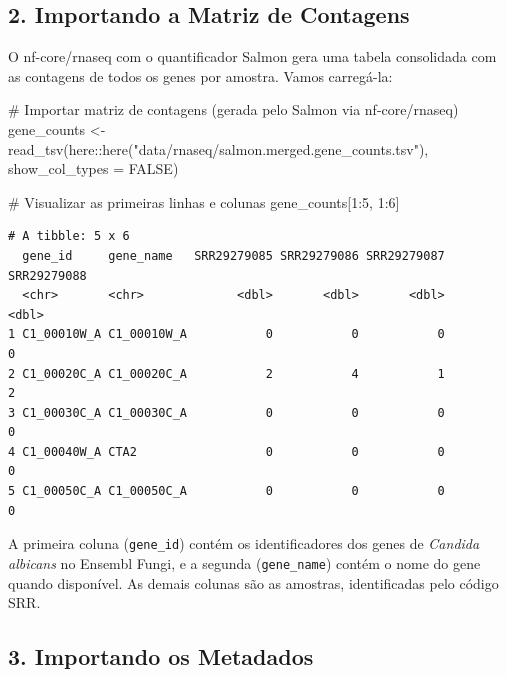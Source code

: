 \documentclass[
  letterpaper,
  DIV=11,
  numbers=noendperiod]{scrreprt}
\newenvironment{Shaded}{\begin{snugshade}}{\end{snugshade}}
\newcommand{\AttributeTok}[1]{\textcolor[rgb]{0.40,0.45,0.13}{#1}}
\newcommand{\CommentTok}[1]{\textcolor[rgb]{0.37,0.37,0.37}{#1}}
\newcommand{\ConstantTok}[1]{\textcolor[rgb]{0.56,0.35,0.01}{#1}}
\newcommand{\DecValTok}[1]{\textcolor[rgb]{0.68,0.00,0.00}{#1}}
\newcommand{\FunctionTok}[1]{\textcolor[rgb]{0.28,0.35,0.67}{#1}}
\newcommand{\NormalTok}[1]{\textcolor[rgb]{0.00,0.23,0.31}{#1}}
\newcommand{\OtherTok}[1]{\textcolor[rgb]{0.00,0.23,0.31}{#1}}
\newcommand{\SpecialCharTok}[1]{\textcolor[rgb]{0.37,0.37,0.37}{#1}}
\newcommand{\StringTok}[1]{\textcolor[rgb]{0.13,0.47,0.30}{#1}}
\begin{document}
\subsection{2. Importando a Matriz de
Contagens}\label{importando-a-matriz-de-contagens}

O nf-core/rnaseq com o quantificador Salmon gera uma tabela consolidada
com as contagens de todos os genes por amostra. Vamos carregá-la:

\begin{Shaded}
\begin{Highlighting}[]
\CommentTok{\# Importar matriz de contagens (gerada pelo Salmon via nf{-}core/rnaseq)}
\NormalTok{gene\_counts }\OtherTok{\textless{}{-}} \FunctionTok{read\_tsv}\NormalTok{(here}\SpecialCharTok{::}\FunctionTok{here}\NormalTok{(}\StringTok{"data/rnaseq/salmon.merged.gene\_counts.tsv"}\NormalTok{),}
                        \AttributeTok{show\_col\_types =} \ConstantTok{FALSE}\NormalTok{)}

\CommentTok{\# Visualizar as primeiras linhas e colunas}
\NormalTok{gene\_counts[}\DecValTok{1}\SpecialCharTok{:}\DecValTok{5}\NormalTok{, }\DecValTok{1}\SpecialCharTok{:}\DecValTok{6}\NormalTok{]}
\end{Highlighting}
\end{Shaded}

\begin{verbatim}
# A tibble: 5 x 6
  gene_id     gene_name   SRR29279085 SRR29279086 SRR29279087 SRR29279088
  <chr>       <chr>             <dbl>       <dbl>       <dbl>       <dbl>
1 C1_00010W_A C1_00010W_A           0           0           0           0
2 C1_00020C_A C1_00020C_A           2           4           1           2
3 C1_00030C_A C1_00030C_A           0           0           0           0
4 C1_00040W_A CTA2                  0           0           0           0
5 C1_00050C_A C1_00050C_A           0           0           0           0
\end{verbatim}

A primeira coluna (\texttt{gene\_id}) contém os identificadores dos
genes de \emph{Candida albicans} no Ensembl Fungi, e a segunda
(\texttt{gene\_name}) contém o nome do gene quando disponível. As demais
colunas são as amostras, identificadas pelo código SRR.

\subsection{3. Importando os Metadados}\label{importando-os-metadados}
\end{document}
